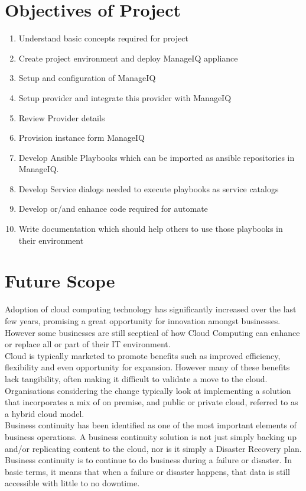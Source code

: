 \documentclass[a4paper,12pt]{report}
\begin{document}
\chapter{Objectives of Project}
\begin{enumerate}
	\item Understand basic concepts required for project
	\item Create project environment and deploy ManageIQ appliance
	\item Setup and configuration of ManageIQ 
	\item Setup provider and integrate 	this provider with ManageIQ
	\item Review Provider details 
	\item Provision instance form ManageIQ
	\item Develop Ansible Playbooks which can be imported as ansible repositories in ManageIQ.
	\item Develop Service dialogs needed to execute playbooks as service catalogs
	\item Develop or/and enhance code required for automate
	\item Write documentation which should help others to use those playbooks in their environment
\end{enumerate}

\chapter{Future Scope}
Adoption of cloud computing technology has significantly increased over the last few years, promising a great opportunity for innovation amongst businesses. However some businesses are still sceptical of how Cloud Computing can enhance or replace all or part of their IT environment.\\

Cloud is typically marketed to promote benefits such as improved efficiency, flexibility and even opportunity for expansion. However many of these benefits lack tangibility, often making it difficult to validate a move to the cloud.\\

Organisations considering the change typically look at implementing a solution that incorporates a mix of on premise, and public or private cloud, referred to as a hybrid cloud model.\\

Business continuity has been identified as one of the most important elements of business operations. A business continuity solution is not just simply backing up and/or replicating content to the cloud, nor is it simply a Disaster Recovery plan. Business continuity is to continue to do business during a failure or disaster. In basic terms, it means that when a failure or disaster happens, that data is still accessible with little to no downtime.\\
\end{document}
